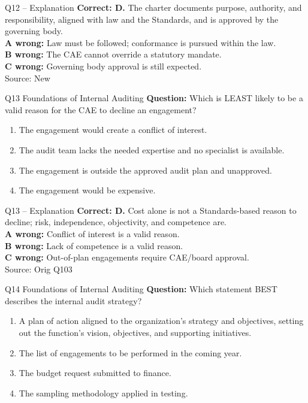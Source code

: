 \documentclass[aspectratio=169,10pt]{beamer}
\begin{document}
\begin{frame}[t]{Q12 -- Explanation}
	\footnotesize
	\textbf{Correct: D.} The charter documents purpose, authority, and responsibility, aligned with law and the Standards, and is approved by the governing body. \\[5pt]
\textbf{A wrong:} Law must be followed; conformance is pursued within the law. \\[3pt]
\textbf{B wrong:} The CAE cannot override a statutory mandate. \\[3pt]
\textbf{C wrong:} Governing body approval is still expected. \\[3pt]
	\vfill {\tiny Source: New}
\end{frame}

\begin{frame}[t]{Q13 \hfill {\scriptsize Foundations of Internal Auditing}}
	\small
	\textbf{Question:} Which is LEAST likely to be a valid reason for the CAE to decline an engagement?
	\begin{enumerate}[label=\Alph*.,itemsep=1pt,topsep=3pt]
			\item The engagement would create a conflict of interest.
			\item The audit team lacks the needed expertise and no specialist is available.
			\item The engagement is outside the approved audit plan and unapproved.
			\item The engagement would be expensive.
	\end{enumerate}
\end{frame}

\begin{frame}[t]{Q13 -- Explanation}
	\footnotesize
	\textbf{Correct: D.} Cost alone is not a Standards-based reason to decline; risk, independence, objectivity, and competence are. \\[5pt]
\textbf{A wrong:} Conflict of interest is a valid reason. \\[3pt]
\textbf{B wrong:} Lack of competence is a valid reason. \\[3pt]
\textbf{C wrong:} Out-of-plan engagements require CAE/board approval. \\[3pt]
	\vfill {\tiny Source: Orig Q103}
\end{frame}

\begin{frame}[t]{Q14 \hfill {\scriptsize Foundations of Internal Auditing}}
	\small
	\textbf{Question:} Which statement BEST describes the internal audit strategy?
	\begin{enumerate}[label=\Alph*.,itemsep=1pt,topsep=3pt]
			\item A plan of action aligned to the organization's strategy and objectives, setting out the function's vision, objectives, and supporting initiatives.
			\item The list of engagements to be performed in the coming year.
			\item The budget request submitted to finance.
			\item The sampling methodology applied in testing.
	\end{enumerate}
\end{frame}
\end{document}
